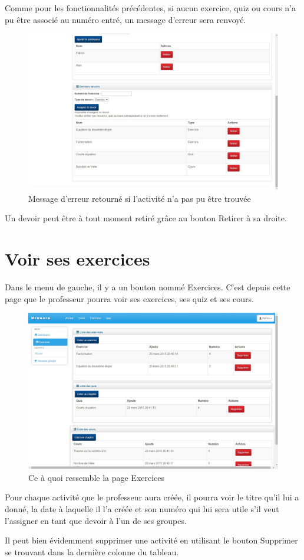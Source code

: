 \documentclass[a4paper,10pt,french]{sphinxmanual}
\begin{document}
Comme pour les fonctionnalités précédentes, si aucun exercice, quiz ou cours
n'a pu être associé au numéro entré, un message d'erreur sera renvoyé.
\begin{figure}[htbp]
\centering
\capstart

\includegraphics[width=0.500\linewidth]{devoirErreur.jpg}
\caption{Message d'erreur retourné si l'activité n'a pas pu être trouvée}\end{figure}

Un devoir peut être à tout moment retiré grâce au bouton Retirer à sa droite.


\section{Voir ses exercices}
\label{dashboard:voir-ses-exercices}
Dans le menu de gauche, il y a un bouton nommé Exercices. C'est depuis cette
page que le professeur pourra voir ses exercices, ses quiz et ses cours.
\begin{figure}[htbp]
\centering
\capstart

\includegraphics[width=0.500\linewidth]{exercices.jpg}
\caption{Ce à quoi ressemble la page Exercices}\end{figure}

Pour chaque activité que le professeur aura créée, il pourra voir le titre qu'il
lui a donné, la date à laquelle il l'a créée et son numéro qui lui sera utile
s'il veut l'assigner en tant que devoir à l'un de ses groupes.

Il peut bien évidemment supprimer une activité en utilisant le bouton Supprimer
se trouvant dans la dernière colonne du tableau.
\end{document}
